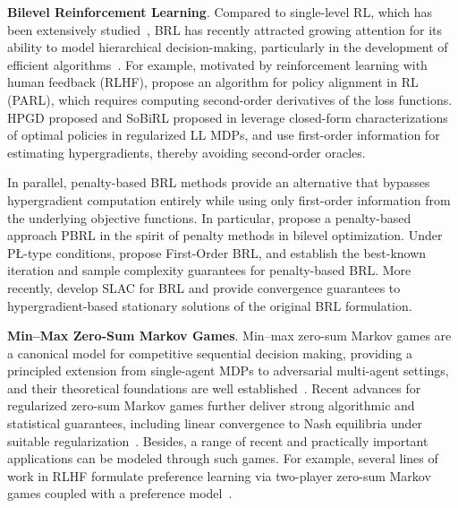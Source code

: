 \documentclass{article}
\theoremstyle{plain}
\theoremstyle{definition}
\theoremstyle{remark}
\begin{document}
\vspace{-1mm}
\textbf{Bilevel Reinforcement Learning}. Compared to single-level RL, which has been extensively studied~\citep{sutton1999policy,nachum2017bridging,sutton2018reinforcement,geist2019theory,mei2020global,agarwal2021theory,xiao2022convergence}, BRL has recently attracted growing attention for its ability to model hierarchical decision-making, particularly in the development of efficient algorithms~\citep{chen2022adaptive,chakraborty2024parl,li2024getting}. For example, motivated by reinforcement learning with human feedback (RLHF), \citet{chakraborty2024parl} propose an algorithm for policy alignment in RL (PARL), which requires computing second-order derivatives of the loss functions. HPGD proposed \citet{thoma2024contextual} and SoBiRL proposed in \citet{yang2025bilevel} leverage closed-form characterizations of optimal policies in regularized LL MDPs, and use first-order information for estimating hypergradients, thereby avoiding second-order oracles.

\vspace{-1mm}
In parallel, penalty-based BRL methods provide an alternative that bypasses hypergradient computation entirely while using only first-order information from the underlying objective functions. In particular, \citet{shen2025principled} propose a penalty-based approach PBRL in the spirit of penalty methods in bilevel optimization. Under P{\L}-type conditions, \citet{gaur2025on} propose First-Order BRL, and establish the best-known iteration and sample complexity guarantees for penalty-based BRL. More recently, \citet{zeng2025regularized} develop SLAC for BRL and provide convergence guarantees to hypergradient-based stationary solutions of the original BRL formulation.

\vspace{-1mm}
\textbf{Min--Max Zero-Sum Markov Games}. Min--max zero-sum Markov games are a canonical model for competitive sequential decision making, providing a principled extension from single-agent MDPs to adversarial multi-agent settings, and their theoretical foundations are well established~\citep{littman1994markov,bai2020near,bai2020provable,yang2023t,kalogiannis2025solving}. Recent advances for regularized zero-sum Markov games further deliver strong algorithmic and statistical guarantees, including linear convergence to Nash equilibria under suitable regularization~\citep{zeng2022regularized,cen2023faster,cen2024fast,nayak2025achieving}. Besides, a range of recent and practically important applications can be modeled through such games. For example, several lines of work in RLHF formulate preference learning via two-player zero-sum Markov games coupled with a  preference model~\citep{swamy2024minimaximalist,rosset2024direct,munos2024nash,ye2024online,zhang2025iterative,zhou2025extragradient}. 
\end{document}
